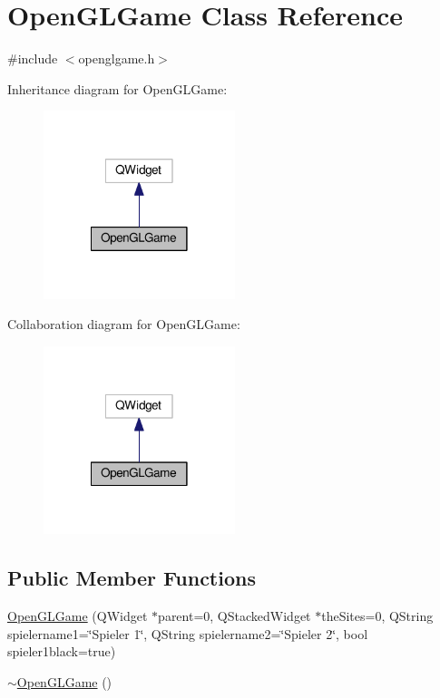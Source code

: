 \hypertarget{classOpenGLGame}{\section{Open\-G\-L\-Game Class Reference}
\label{classOpenGLGame}
}


{\ttfamily \#include $<$openglgame.\-h$>$}



Inheritance diagram for Open\-G\-L\-Game\-:\nopagebreak
\begin{figure}[H]
\begin{center}
\leavevmode
\includegraphics[width=158pt]{classOpenGLGame__inherit__graph}
\end{center}
\end{figure}


Collaboration diagram for Open\-G\-L\-Game\-:\nopagebreak
\begin{figure}[H]
\begin{center}
\leavevmode
\includegraphics[width=158pt]{classOpenGLGame__coll__graph}
\end{center}
\end{figure}
\subsection*{Public Member Functions}
\begin{DoxyCompactItemize}
\item 
\hyperlink{classOpenGLGame_a9082f6e7cad74cd49dab386bf14dc185}{Open\-G\-L\-Game} (Q\-Widget $\ast$parent=0, Q\-Stacked\-Widget $\ast$the\-Sites=0, Q\-String spielername1=\char`\"{}Spieler 1\char`\"{}, Q\-String spielername2=\char`\"{}Spieler 2\char`\"{}, bool spieler1black=true)
\item 
\hyperlink{classOpenGLGame_a20705f1f3f495f65f2879681a20eb43b}{$\sim$\-Open\-G\-L\-Game} ()
\end{DoxyCompactItemize}


